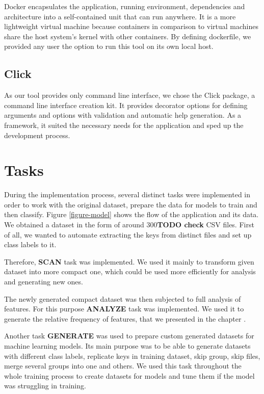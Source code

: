 Docker encapsulates the application, running environment, dependencies and architecture into a self-contained unit that can run anywhere. It is a more lightweight virtual machine because containers in comparison to virtual machines share the host system's kernel with other containers\cite{docker-blog}. By defining dockerfile, we provided any user the option to run this tool on its own local host.

\subsection{Click}

As our tool provides only command line interface, we chose the Click package\cite{click}, a command line interface creation kit. It provides decorator options for defining arguments and options with validation and automatic help generation. As a framework, it suited the necessary needs for the application and sped up the development process.

\section{Tasks}

During the implementation process, several distinct tasks were implemented in order to work with the original dataset, prepare the data for models to train and then classify. Figure \ref{figure-model} shows the flow of the application and its data. We obtained a dataset in the form of around 300\textbf{TODO check} CSV files. First of all, we wanted to automate extracting the keys from distinct files and set up class labels to it. 

Therefore, \textbf{SCAN} task was implemented. We used it mainly to transform given dataset into more compact one, which could be used more efficiently for analysis and generating new ones.

The newly generated compact dataset was then subjected to full analysis of features. For this purpose \textbf{ANALYZE} task was implemented. We used it to generate the relative frequency of features, that we presented in the chapter \label{chapter-analysis}.

Another task \textbf{GENERATE} was used to prepare custom generated datasets for machine learning models. Its main purpose was to be able to generate datasets with different class labels, replicate keys in training dataset, skip group, skip files, merge several groups into one and others. We used this task throughout the whole training process to create datasets for models and tune them if the model was struggling in training.

